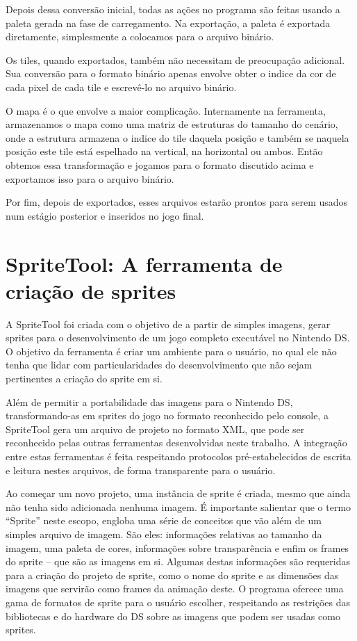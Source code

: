 \documentclass[brazil]{abnt}
\begin{document}
Depois dessa conversão inicial, todas as ações no programa são feitas usando a paleta gerada na fase de carregamento. Na exportação, a paleta é exportada diretamente, simplesmente a colocamos para o arquivo binário.

Os tiles, quando exportados, também não necessitam de preocupação adicional. Sua conversão para o formato binário apenas envolve obter o indice da cor de cada pixel de cada tile e escrevê-lo no arquivo binário.

O mapa é o que envolve a maior complicação. Internamente na ferramenta, armazenamos o mapa como uma matriz de estruturas do tamanho do cenário, onde a estrutura armazena o indice do tile daquela posição e também se naquela posição este tile está espelhado na vertical, na horizontal ou ambos. Então obtemos essa transformação e jogamos para o formato discutido acima e exportamos isso para o arquivo binário.

Por fim, depois de exportados, esses arquivos estarão prontos para serem usados num estágio posterior e inseridos no jogo final.

\section{SpriteTool: A ferramenta de criação de sprites}

A SpriteTool foi criada com o objetivo de a partir de simples imagens, gerar sprites para o desenvolvimento de um jogo completo executável no Nintendo DS. O objetivo da ferramenta é criar um ambiente para o usuário, no qual ele não tenha que lidar com particularidades do desenvolvimento que não sejam pertinentes a criação do sprite em si.

Além de permitir a portabilidade das imagens para o Nintendo DS, transformando-as em sprites do jogo no formato reconhecido pelo console, a SpriteTool gera um arquivo de projeto no formato XML, que pode ser reconhecido pelas outras ferramentas desenvolvidas neste trabalho. A integração entre estas ferramentas é feita respeitando protocolos pré-estabelecidos de escrita e leitura nestes arquivos, de forma transparente para o usuário.

Ao começar um novo projeto, uma instância de sprite é criada, mesmo que ainda não tenha sido adicionada nenhuma imagem. É importante salientar que o termo “Sprite” neste escopo, engloba uma série de conceitos que vão além de um simples arquivo de imagem. São eles: informações relativas ao tamanho da imagem, uma paleta de cores, informações sobre transparência e enfim os frames do sprite – que são as imagens em si.
Algumas destas informações são requeridas para a criação do projeto de sprite, como o nome do sprite e as dimensões das imagens que servirão como frames da animação deste. O programa oferece uma gama de formatos de sprite para o usuário escolher, respeitando as restrições das bibliotecas e do hardware do DS sobre as imagens que podem ser usadas como sprites.
\end{document}
